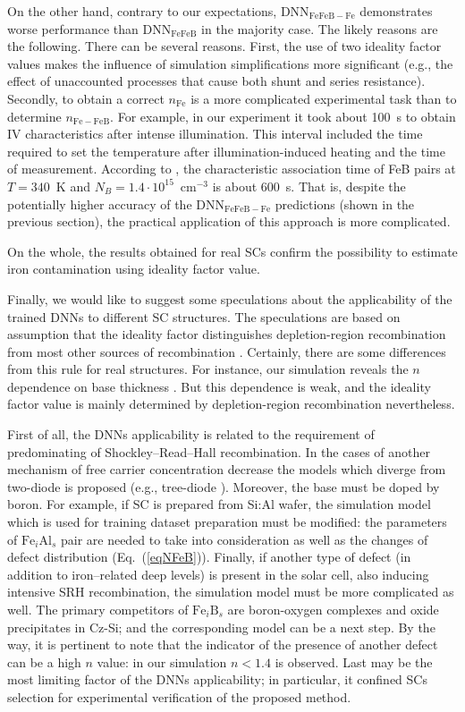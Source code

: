 \documentclass[num-refs]{wiley-article} %
\begin{document}
On the other hand, contrary to our expectations, DNN$_\mathrm{FeFeB-Fe}$ demonstrates worse performance
than DNN$_\mathrm{FeFeB}$ in the majority case.
The likely reasons are the following.
There can be several reasons.
First, the use of two ideality factor values makes the influence of simulation simplifications more significant
(e.g., the effect of unaccounted processes that cause both shunt and series resistance).
Secondly, to obtain a correct $n_\mathrm{Fe}$ is a more complicated experimental task than to determine $n_\mathrm{Fe-FeB}$.
For example, in our experiment it took about 100~s to obtain IV characteristics after intense illumination.
This interval included the time required to set the temperature after illumination-induced heating and the time of measurement.
According to \cite{FeBAssJAP2014,FeBKin2019}, the characteristic association time of FeB pairs
at $T=340$~K and $N_B=1.4\cdot10^{15}$~cm$^{-3}$ is about 600~s.
That is, despite the potentially higher accuracy of the DNN$_\mathrm{FeFeB-Fe}$ predictions
(shown in the previous section), the practical application of this approach is more complicated.

On the whole, the results obtained for real SCs confirm the possibility to estimate iron contamination using ideality factor value.

Finally, we would like to suggest some speculations about the applicability of the trained DNNs to different SC structures.
The speculations are based on assumption that the ideality factor distinguishes
depletion-region recombination from most other sources of recombination \cite{Breitenstein2013,n2McIntosh}.
Certainly, there are some differences from this rule for real structures.
For instance, our simulation reveals the $n$ dependence on base thickness \cite{OlikhJPS}.
But this dependence is weak, and the ideality factor value is mainly determined
by depletion-region recombination nevertheless.

First of all, the DNNs applicability is related to the requirement of
predominating of Shockley–Read–Hall recombination.
In the cases of another mechanism of free carrier concentration decrease the
models which diverge from two-diode is proposed (e.g., tree-diode \cite{TreeDiode,Shah}).
Moreover, the base must be doped by boron.
For example, if SC is prepared from Si:Al wafer,
the simulation model which is used for training dataset preparation  must
be modified: the parameters of $\mathrm{Fe}_i\mathrm{Al}_s$ pair are needed
to take into consideration as well as the changes of defect
distribution (Eq.~(\ref{eqNFeB})).
Finally, if another type of defect (in addition to iron--related deep levels)
is present in the solar cell, also inducing intensive SRH recombination,
the simulation model must be more complicated as well.
The primary competitors of $\mathrm{Fe}_i\mathrm{B}_s$  are  boron-oxygen complexes \cite{LIDRev,LIDRev2}
and oxide precipitates \cite{MurphySC2014,Oxide:Chen} in Cz-Si;
and the corresponding model can be a next step.
By the way, it is pertinent to note that the indicator of
the presence of another defect can be a high $n$ value:
in our simulation $n<1.4$ is observed.
Last may be the most limiting factor of the DNNs applicability;
in particular, it confined SCs selection for experimental verification of the proposed method.
\end{document}
